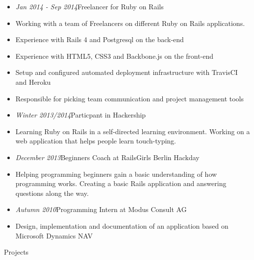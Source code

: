 \documentclass[12pt]{article}
\begin{document}
\begin{itemize}
  \setlength{\itemsep}{0cm}
  \setlength{\parskip}{0cm}

  \item[] \emph{Jan 2014 - Sep 2014}\hfill Freelancer for Ruby on Rails
  \item[] Working with a team of Freelancers on different Ruby on Rails applications.
  \item[] Experience with Rails 4 and Postgresql on the back-end
  \item[] Experience with HTML5, CSS3 and Backbone.js on the front-end
  \item[] Setup and configured automated deployment infrastructure with TravisCI and Heroku
  \item[] Responsible for picking team communication and project management tools
\end{itemize}

\begin{itemize}
  \setlength{\itemsep}{0cm}
  \setlength{\parskip}{0cm}

  \item[] \emph{Winter 2013/2014}\hfill Particpant in Hackership
  \item[] Learning Ruby on Rails in a self-directed learning environment. Working on a web application that helps people learn touch-typing.
\end{itemize}

\begin{itemize}
  \setlength{\itemsep}{0cm}
  \setlength{\parskip}{0cm}

  \item[] \emph{December 2013}\hfill Beginners Coach at RailsGirls Berlin Hackday
  \item[] Helping programming beginners gain a basic understanding of how programming works. Creating a basic Rails application and answering questions along the way.
\end{itemize}

\begin{itemize}
  \setlength{\itemsep}{0cm}
  \setlength{\parskip}{0cm}

  \item[] \emph{Autumn 2010}\hfill Programming Intern at Modus Consult AG
  \item[] Design, implementation and documentation of an application based on Microsoft Dynamics NAV
\end{itemize}

\vspace{0.5cm}
{\Large Projects}
\end{document}
